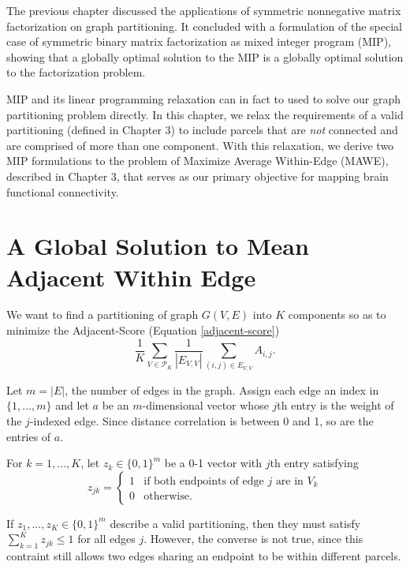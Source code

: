 The previous chapter discussed the applications of symmetric
nonnegative matrix factorization on graph partitioning. It concluded
with a formulation of the special case of symmetric binary matrix
factorization as mixed integer program (MIP), showing that a globally
optimal solution to the MIP is a globally optimal solution to the
factorization problem.

MIP and its linear programming relaxation can in fact to used to solve
our graph partitioning problem directly. In this chapter, we relax the
requirements of a valid partitioning (defined in Chapter 3) to include
parcels that are \textit{not} connected and are comprised of more than
one component. With this relaxation, we derive two MIP formulations to
the problem of Maximize Average Within-Edge (MAWE), described in Chapter
3, that serves as our primary objective for mapping brain functional
connectivity.

\section{A Global Solution to Mean Adjacent Within Edge}

We want to find a partitioning of graph $G(V,E)$ into $K$ components
so as to minimize the Adjacent-Score (Equation \ref{adjacent-score})
\[ \frac{1}{K} \sum_{V \in \mathcal{P}_K}
   \frac{1}{|E_{V,V}|} \sum_{(i,j) \in E_{V,V}} A_{i,j}.
\]

Let $m = |E|$, the number of edges in the graph. Assign each edge an
index in $\{1, ..., m\}$ and 
let $a$ be an $m$-dimensional vector whose $j$th entry is the weight of
the $j$-indexed edge. Since distance correlation is between 0 and 1, so
are the entries of $a$.

For $k = 1, ..., K$, let $z_k \in \{0, 1\}^m$ be a 0-1 vector with
$j$th entry satisfying
\[ z_{jk} = \begin{cases}
  1 & \text{if both endpoints of edge } j \text{ are in } V_k \\
  0 & \text{otherwise}.
\end{cases} \]

If $z_1, ..., z_K \in \{0, 1\}^m$ describe a valid partitioning, then
they must satisfy $\sum_{k=1}^K z_{jk} \leq 1$ for all edges $j$.
However, the converse is not true, since this contraint still allows two
edges sharing an endpoint to be within different parcels.

